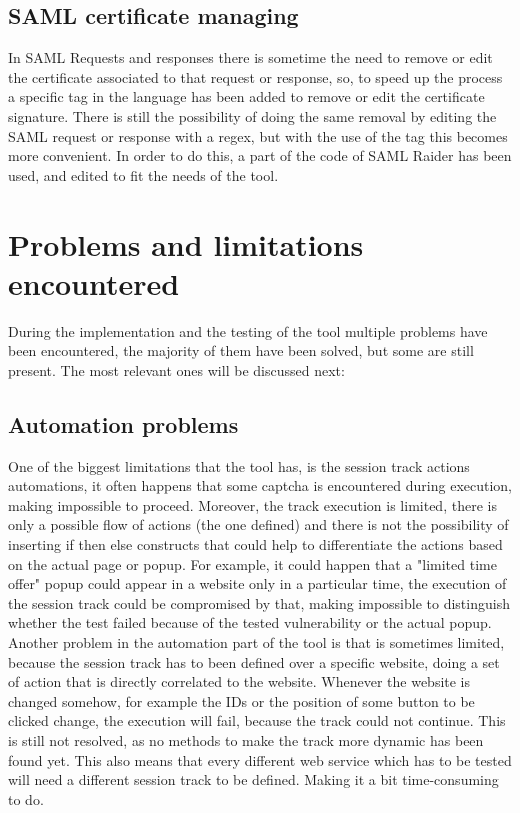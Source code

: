 \subsection{SAML certificate managing}
In \Gls{SAML} Requests and responses there is sometime the need to remove or edit the certificate associated to that request or response, so, to speed up the process a specific tag in the language has been added to remove or edit the certificate signature. There is still the possibility of doing the same removal by editing the \Gls{SAML} request or response with a regex, but with the use of the tag this becomes more convenient.
In order to do this, a part of the code of SAML Raider \cite{saml_raider} has been used, and edited to fit the needs of the tool.

\section{Problems and limitations encountered}
\label{sec:limitations}
During the implementation and the testing of the tool multiple problems have been encountered, the majority of them have been solved, but some are still present. The most relevant ones will be discussed next:

\subsection{Automation problems}
One of the biggest limitations that the tool has, is the session track actions automations, it often happens that some captcha is encountered during execution, making impossible to proceed. Moreover, the track execution is limited, there is only a possible flow of actions (the one defined) and there is not the possibility of inserting if then else constructs that could help to differentiate the actions based on the actual page or popup. For example, it could happen that a "limited time offer" popup could appear in a website only in a particular time, the execution of the session track could be compromised by that, making impossible to distinguish whether the test failed because of the tested vulnerability or the actual popup.
Another problem in the automation part of the tool is that is sometimes limited, because the session track has to been defined over a specific website, doing a set of action that is directly correlated to the website. Whenever the website is changed somehow, for example the IDs or the position of some button to be clicked change, the execution will fail, because the track could not continue.
This is still not resolved, as no methods to make the track more dynamic has been found yet. This also means that every different web service which has to be tested will need a different session track to be defined. Making it a bit time-consuming to do. 

